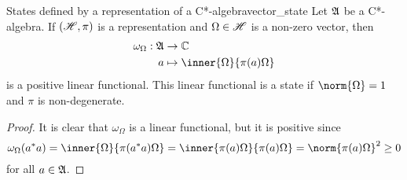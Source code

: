 
\begin{proposition}{States defined by a representation of a C*-algebra}{vector_state}
    Let \(\mathfrak{A}\) be a C*-algebra. If \((\mathscr{H}, \pi)\) is a representation and \(\Omega \in \mathscr{H}\) is a non-zero vector, then
    \begin{align*}
        \omega_{\Omega} : \algebra{A} &\to \mathbb{C}\\
                                    a &\mapsto \inner{\Omega}{\pi(a)\Omega}
    \end{align*}
    is a positive linear functional. This linear functional is a state if \(\norm{\Omega} = 1\) and \(\pi\) is non-degenerate.
\end{proposition}
\begin{proof}
    It is clear that \(\omega_{\Omega}\) is a linear functional, but it is positive since
    \begin{equation*}
        \omega_{\Omega}(a^*a) = \inner{\Omega}{\pi(a^*a)\Omega} = \inner{\pi(a)\Omega}{\pi(a)\Omega} = \norm{\pi(a)\Omega}^2 \geq 0
    \end{equation*}
    for all \(a \in \mathfrak{A}\).
\end{proof}
